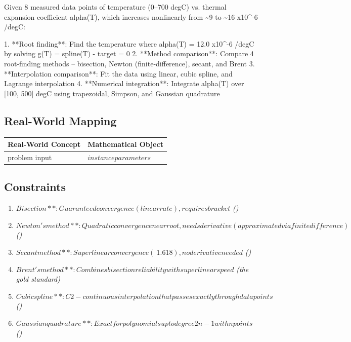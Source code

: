 \documentclass[11pt, a4paper]{article}
\begin{document}
Given 8 measured data points of temperature (0--700 degC) vs. thermal expansion coefficient alpha(T), which increases nonlinearly from \textasciitilde{}9 to \textasciitilde{}16 x10\textasciicircum{}-6 /degC:

1. **Root finding**: Find the temperature where alpha(T) = 12.0 x10\textasciicircum{}-6 /degC by solving g(T) = spline(T) - target = 0
2. **Method comparison**: Compare 4 root-finding methods -- bisection, Newton (finite-difference), secant, and Brent
3. **Interpolation comparison**: Fit the data using linear, cubic spline, and Lagrange interpolation
4. **Numerical integration**: Integrate alpha(T) over [100, 500] degC using trapezoidal, Simpson, and Gaussian quadrature

\subsection{Real-World Mapping}

\begin{longtable}{ll}
\toprule
\textbf{Real-World Concept} & \textbf{Mathematical Object} \\
\midrule
\endhead
problem input & $instance parameters$ \\
\bottomrule
\end{longtable}

\subsection{Constraints}

\begin{enumerate}
  \item $Bisection**: Guaranteed convergence (linear rate), requires bracket$
  \hfill \textit{()}
  \item $Newton's method**: Quadratic convergence near root, needs derivative (approximated via finite difference)$
  \hfill \textit{()}
  \item $Secant method**: Superlinear convergence (~1.618), no derivative needed$
  \hfill \textit{()}
  \item $Brent's method**: Combines bisection reliability with superlinear speed$
  \hfill \textit{(the gold standard)}
  \item $Cubic spline**: C2-continuous interpolation that passes exactly through data points$
  \hfill \textit{()}
  \item $Gaussian quadrature**: Exact for polynomials up to degree 2n-1 with n points$
  \hfill \textit{()}
\end{enumerate}
\end{document}
